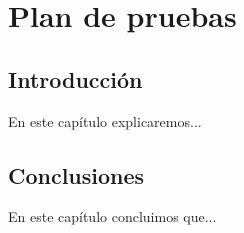 \chapter{Plan de pruebas}\label{cap:pruebas}

\section{Introducción}
En este capítulo explicaremos...

\section{Conclusiones}
En este capítulo concluimos que...